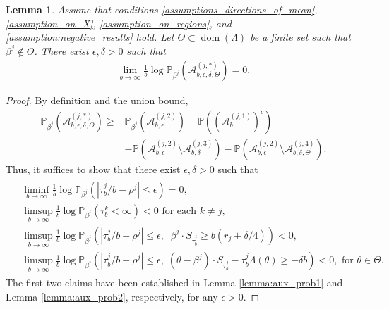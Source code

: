 \documentclass[aap,preprint]{imsart}
\newcommand{\Pro}{{\mathbb{P}}}
\theoremstyle{plain}
\newtheorem{lemma}[theorem]{Lemma}
\theoremstyle{definition}
\begin{document}
\begin{appendix}
\begin{lemma}\label{aux_lemma_overall}
    Assume that conditions \eqref{assumptions_directions_of_mean}, \eqref{assumption_on_X},  \eqref{assumption_on_regions}, and \eqref{assumption:negative_results} hold.    Let   $\Theta \subset \operatorname{dom}(\Lambda)$ be a finite set such that $\beta^j \not \in \Theta$. There exist  $\epsilon, \delta > 0$ such that
    \begin{align*}
       \lim_{b \to \infty}  \frac{1}{b} \log \Pro_{\beta^j}\left(\mathcal{A}_{b,\epsilon,\delta,\Theta}^{(j,*)} \right) = 0.
    \end{align*}
\end{lemma}
\begin{proof}
By definition and the union bound,
\begin{align*}
\Pro_{\beta^j}\left(\mathcal{A}_{b,\epsilon,\delta,\Theta}^{(j,*)} \right) \geq &\Pro_{\beta^j}\left(\mathcal{A}_{b,\epsilon}^{(j,2)}\right) - 
\Pro\left( \left(\mathcal{A}_{b}^{(j,1)}\right)^c \right) \\
&- \Pro\left( \mathcal{A}_{b,\epsilon}^{(j,2)}  \setminus \mathcal{A}_{b,\delta}^{(j,3)} \right) -
\Pro\left( \mathcal{A}_{b,\epsilon}^{(j,2)} \setminus \mathcal{A}_{b,\delta,\Theta}^{(j,4)} \right).
\end{align*}
Thus, it suffices to show that there exist $\epsilon,\delta > 0$ such that
\begin{align}
\begin{split}
     &\liminf_{b \to \infty}  \frac{1}{b} \log    \Pro_{\beta^j}\left(\left|{\tau_b^j}/{b} - \rho^{j}\right| \leq \epsilon  \right) = 0, \\
 & \limsup_{b \to \infty}  \frac{1}{b} \log    \Pro_{\beta^j}\left(\tau_b^{k} < \infty \right) < 0  \text{ for each } k \neq j, \\
  & \limsup_{b \to \infty}  \frac{1}{b} \log    \Pro_{\beta^j}\left(\left|{\tau_b^j}/{b} - \rho^{j}\right| \leq   \epsilon , \;\; \beta^j \cdot S_{\tau_b^j} \geq  b(r_j + \delta/4) \right) < 0, \\
   & \limsup_{b \to \infty}  \frac{1}{b} \log    \Pro_{\beta^j}\left(\left|{\tau_b^j}/{b} - \rho^{j}\right| \leq \epsilon,\; (\theta-\beta^j) \cdot S_{\tau_b^j} - \tau_b^j \Lambda(\theta)  \geq 
-\delta b  \right) < 0, \text{ for } \theta \in \Theta.
\end{split}
\label{eqref:aux_overall}
\end{align}
The first two claims have been established in Lemma \ref{lemma:aux_prob1} and Lemma \ref{lemma:aux_prob2}, respectively, for any $\epsilon > 0$.


\end{proof}
\end{appendix}
\end{document}

